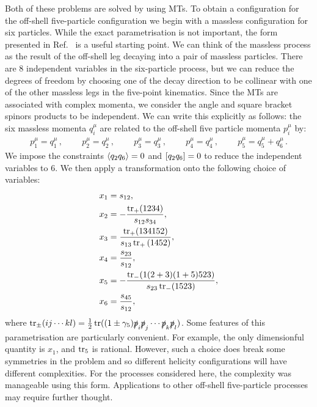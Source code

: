 \documentclass[main.tex]{subfiles}
\begin{document}
Both of these problems are solved by using MTs. To obtain a configuration for the off-shell five-particle configuration we begin with a massless configuration for six particles. While the exact parametrisation is not important, the form presented in Ref.~\cite{Badger:2016uuq} is a useful starting point. We can think of the massless process as the result of the off-shell leg decaying into a pair of massless particles. There are 8 independent variables in the six-particle process, but we can reduce the degrees of freedom by choosing one of the decay direction to be collinear with one of the other massless legs in the five-point kinematics. Since the MTs are associated with complex momenta, we consider the angle and square bracket spinors products to be independent. We can write this explicitly as follows: the six massless momenta $q_i^\mu$ are related to the off-shell five particle momenta $p_i^\mu$ by:
\begin{align}
  p_1^\mu = q_1^\mu\,, \ \qquad 
  p_2^\mu = q_2^\mu\,, \ \qquad 
  p_3^\mu = q_3^\mu\,, \ \qquad
  p_4^\mu = q_4^\mu \,, \ \qquad
  p_5^\mu = q_5^\mu+q_6^\mu \,.
\end{align}
We impose the constraints $\langle q_2q_6\rangle = 0 $ and $[q_2q_6] = 0$ to reduce the independent variables to 6. 
We then apply a transformation onto the following choice of variables:
\begin{equation}
\begin{aligned}
  x_1 &= s_{12}, \\
  x_2 &= -\frac{\operatorname{\rm tr}_+(1234)}{s_{12}s_{34}}, \\
  x_3 &= \frac{\operatorname{\rm tr}_+(134152)}{s_{13}\operatorname{\rm tr}_+{(1452)}}, \\
  x_4 &= \frac{s_{23}}{s_{12}}, \\
  x_5 &= -\frac{\operatorname{\rm tr}_-(1(2+3)(1+5)523)}{s_{23}\operatorname{\rm tr}_-(1523)}, \\
  x_6 &= \frac{s_{45}}{s_{12}},
\end{aligned}
\label{eq:mtvardefs}
\end{equation}
where $\operatorname{\rm tr}_{\pm}(ij \cdots kl) = \frac{1}{2} \operatorname{\rm tr}((1\pm\gamma_5)\slashed{p}_i\slashed{p}_j \cdots\slashed{p}_k\slashed{p}_l)$.
Some features of this parametrisation are particularly convenient. For example, the only dimensionful 
quantity is $x_1$, and $\operatorname{\rm tr}_5$ is rational. However, such a choice does break some symmetries
in the problem and so different helicity configurations will have different complexities. For the
processes considered here, the complexity was manageable using this form.
Applications to other off-shell five-particle processes may require further thought. 
\end{document}

